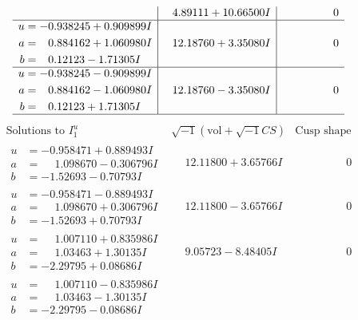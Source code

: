 \documentclass[1p]{elsarticle_modified}
\theoremstyle{definition}
\newcommand{\I}{\sqrt{-1}}
\begin{document}
$$\begin{array}{c|c|c}
 & \phantom{-}4.89111 + 10.66500 I & \phantom{-0.000000 } 0 \\ \hline\begin{aligned}
u &= -0.938245 + 0.909899 I \\
a &= \phantom{-}0.884162 + 1.060980 I \\
b &= \phantom{-}0.12123 - 1.71305 I\end{aligned}
 & \phantom{-}12.18760 + 3.35080 I & \phantom{-0.000000 } 0 \\ \hline\begin{aligned}
u &= -0.938245 - 0.909899 I \\
a &= \phantom{-}0.884162 - 1.060980 I \\
b &= \phantom{-}0.12123 + 1.71305 I\end{aligned}
 & \phantom{-}12.18760 - 3.35080 I & \phantom{-0.000000 } 0\\
 \hline 
 \end{array}$$\newpage$$\begin{array}{c|c|c}  
\text{Solutions to }I^u_{1}& \I (\text{vol} + \sqrt{-1}CS) & \text{Cusp shape}\\
 \hline 
\begin{aligned}
u &= -0.958471 + 0.889493 I \\
a &= \phantom{-}1.098670 - 0.306796 I \\
b &= -1.52693 - 0.70793 I\end{aligned}
 & \phantom{-}12.11800 + 3.65766 I & \phantom{-0.000000 } 0 \\ \hline\begin{aligned}
u &= -0.958471 - 0.889493 I \\
a &= \phantom{-}1.098670 + 0.306796 I \\
b &= -1.52693 + 0.70793 I\end{aligned}
 & \phantom{-}12.11800 - 3.65766 I & \phantom{-0.000000 } 0 \\ \hline\begin{aligned}
u &= \phantom{-}1.007110 + 0.835986 I \\
a &= \phantom{-}1.03463 + 1.30135 I \\
b &= -2.29795 + 0.08686 I\end{aligned}
 & \phantom{-}9.05723 - 8.48405 I & \phantom{-0.000000 } 0 \\ \hline\begin{aligned}
u &= \phantom{-}1.007110 - 0.835986 I \\
a &= \phantom{-}1.03463 - 1.30135 I \\
b &= -2.29795 - 0.08686 I\end{aligned}

\end{array}$$
\end{document}
